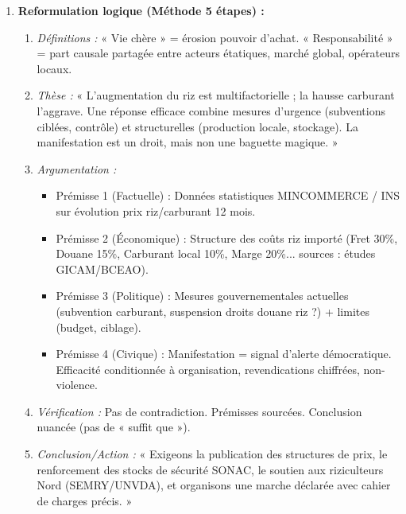 \documentclass[11pt]{article}
\begin{document}
\begin{corrige}
\begin{enumerate}
\begin{enumerate}
        \item \textbf{Cause unique (Réductionnisme) :} Prix riz = f(carburant uniquement). Oubli : cours mondial, taux de change, spéculations, coûts transport, douanes, marges distributeurs.
        \item \textbf{Faux dilemme (Dilemme fallacieux) :} « Manifester OU mourir de faim ». Exclusion des autres leviers : dialogue, contrôle prix, production locale, aides ciblées, grève consommation.
        \item \textbf{Appel à la peur / À l'émotion (Ad metum / Ad passiones) :} « Mourir de faim », « Partagez massivement » (viralité émotionnelle).
        \item \textbf{Généralisation abusive / Homme de paille :} « Le gouvernement ne fait RIEN » (absolu, invérifiable, caricature).
    \end{enumerate}
    \item \textbf{Reformulation logique (Méthode 5 étapes) :}
    \begin{enumerate}
        \item \textit{Définitions :} « Vie chère » = érosion pouvoir d'achat. « Responsabilité » = part causale partagée entre acteurs étatiques, marché global, opérateurs locaux.
        \item \textit{Thèse :} « L'augmentation du riz est multifactorielle ; la hausse carburant l'aggrave. Une réponse efficace combine mesures d'urgence (subventions ciblées, contrôle) et structurelles (production locale, stockage). La manifestation est un droit, mais non une baguette magique. »
        \item \textit{Argumentation :}
        \begin{itemize}
            \item Prémisse 1 (Factuelle) : Données statistiques MINCOMMERCE / INS sur évolution prix riz/carburant 12 mois.
            \item Prémisse 2 (Économique) : Structure des coûts riz importé (Fret 30\%, Douane 15\%, Carburant local 10\%, Marge 20\%... sources : études GICAM/BCEAO).
            \item Prémisse 3 (Politique) : Mesures gouvernementales actuelles (subvention carburant, suspension droits douane riz ?) + limites (budget, ciblage).
            \item Prémisse 4 (Civique) : Manifestation = signal d'alerte démocratique. Efficacité conditionnée à organisation, revendications chiffrées, non-violence.
        \end{itemize}
        \item \textit{Vérification :} Pas de contradiction. Prémisses sourcées. Conclusion nuancée (pas de « suffit que »).
        \item \textit{Conclusion/Action :} « Exigeons la publication des structures de prix, le renforcement des stocks de sécurité SONAC, le soutien aux riziculteurs Nord (SEMRY/UNVDA), et organisons une marche déclarée avec cahier de charges précis. »
    \end{enumerate}
\end{enumerate}
\end{corrige}
\end{document}
